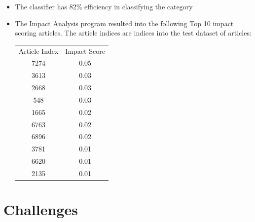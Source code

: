 \documentclass{article}
\begin{document}
\begin{itemize}
	\item The classifier has 82\% efficiency in classifying the category
	\item The Impact Analysis program resulted into the following Top 10 impact scoring articles. The article indices are indices into the test dataset of articles:
	
	\begin{center}
		\begin{tabular}{ c c }
			Article Index & Impact Score \\
			7274 & 0.05 \\ 
			3613 & 0.03 \\  
			2668 & 0.03 \\ 
			548 & 0.03 \\ 
			1665 & 0.02 \\  
			6763 & 0.02 \\ 
			6896 & 0.02 \\ 
			3781 & 0.01 \\  
			6620 & 0.01 \\ 
			2135 & 0.01 \\ 
		\end{tabular}
	\end{center}
\end{itemize}



\maketitle 

\section{Challenges} %
\end{document}

